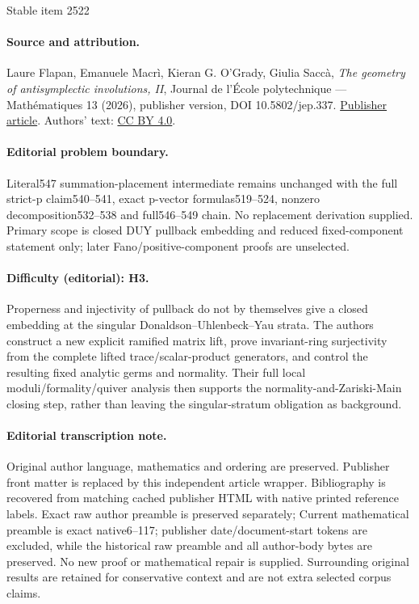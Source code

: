 \documentclass[11pt]{article}
\theoremstyle{definition}
\begin{document}
\begin{center}{\Large Stable item 2522}\end{center}
\paragraph{Source and attribution.}
Laure Flapan, Emanuele Macrì, Kieran G. O’Grady, Giulia Saccà, \emph{The geometry of antisymplectic involutions, II}, Journal de l’École polytechnique — Mathématiques 13 (2026), publisher version, DOI 10.5802/jep.337. \href{https://jep.centre-mersenne.org/articles/10.5802/jep.337/}{Publisher article}. Authors' text: \href{https://creativecommons.org/licenses/by/4.0/}{CC BY 4.0}.
\paragraph{Editorial problem boundary.}
Literal547 summation-placement intermediate remains unchanged with the full strict-p claim540–541, exact p-vector formulas519–524, nonzero decomposition532–538 and full546–549 chain. No replacement derivation supplied. Primary scope is closed DUY pullback embedding and reduced fixed-component statement only; later Fano/positive-component proofs are unselected. 
\paragraph{Difficulty (editorial): H3.}
Properness and injectivity of pullback do not by themselves give a closed embedding at the singular Donaldson–Uhlenbeck–Yau strata. The authors construct a new explicit ramified matrix lift, prove invariant-ring surjectivity from the complete lifted trace/scalar-product generators, and control the resulting fixed analytic germs and normality. Their full local moduli/formality/quiver analysis then supports the normality-and-Zariski-Main closing step, rather than leaving the singular-stratum obligation as background.
\paragraph{Editorial transcription note.}
Original author language, mathematics and ordering are preserved. Publisher front matter is replaced by this independent article wrapper. Bibliography is recovered from matching cached publisher HTML with native printed reference labels. Exact raw author preamble is preserved separately; Current mathematical preamble is exact native6--117; publisher date/document-start tokens are excluded, while the historical raw preamble and all author-body bytes are preserved. No new proof or mathematical repair is supplied. Surrounding original results are retained for conservative context and are not extra selected corpus claims.
\clearpage
\end{document}
